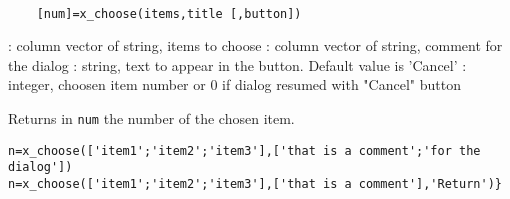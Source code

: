 
\begin{mandesc}
  \\ %
\end{mandesc}
\begin{calling_sequence}
  \begin{verbatim}
    [num]=x_choose(items,title [,button])   
  \end{verbatim}
\end{calling_sequence}
\begin{parameters}
  \begin{varlist}
    : column vector of string,  items to choose
    : column vector of string, comment for the dialog
    :  string, text to appear in the button. Default value is 'Cancel'
    : integer, choosen item number or 0 if dialog resumed with "Cancel" button
  \end{varlist}
\end{parameters}
\begin{mandescription}
  Returns in \verb!num! the number of the chosen item.
\end{mandescription}

\begin{examples}
\begin{Verbatim}
n=x_choose(['item1';'item2';'item3'],['that is a comment';'for the dialog'])
n=x_choose(['item1';'item2';'item3'],['that is a comment'],'Return')}
\end{Verbatim}
\end{examples}
\begin{manseealso}
\end{manseealso}

